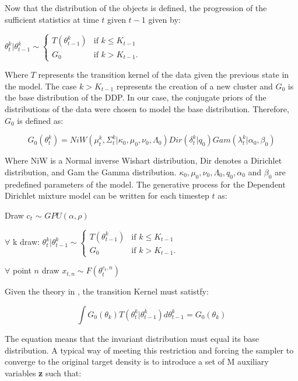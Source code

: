 \documentclass[]{article}
\begin{document}
Now that the distribution of the objects is defined, the progression of the sufficient statistics at time $t$ given $t-1$ given by:

$\theta_t^k | \theta_{t-1}^k \sim
\begin{cases} T (\theta_{t-1}^k) &\mbox{if } k \leq K_{t-1} \\
G_0 & \mbox{if } k > K_{t-1}. \end{cases}$

Where $T$ represents the transition kernel of the data given the previous state in the model. The case $ k > K_{t-1} $ represents the creation of a new cluster and $G_0$ is the base distribution of the DDP. In our case, the conjugate priors of the distributions of the data were chosen to model the base distribution. Therefore, $G_0$ is defined as:

$$ G_0(\theta_t^k)  = NiW( \mu_t^k, \Sigma_t^k | \kappa_0, \mu_0, \nu_0, \Lambda_0 ) Dir(\delta_t^k | q_0) Gam( \lambda_t^k | \alpha_0, \beta_0) $$

Where NiW is a Normal inverse Wishart distribution, Dir denotes a Dirichlet distribution, and Gam the Gamma distribution. $ \kappa_0, \mu_0, \nu_0, \Lambda_0, q_0,\alpha_0$ and $\beta_0$ are predefined parameters of the model. The generative process for the Dependent Dirichlet mixture model can be written for each timestep $t$ as:


\begin{compactitem}
\item Draw  $c_t$ $\sim$ $GPU(\alpha, \rho) $
\item $\forall$  k draw: $ \theta_t^k | \theta_{t-1}^k \sim
    \begin{cases} T (\theta_{t-1}^k) &\mbox{if } k \leq K_{t-1} \\
G_0 & \mbox{if } k > K_{t-1}. \end{cases}$
\item $\forall$  point $n$ draw $ x_{t,n} \sim F(\theta_t^{c_t,n})$
\end{compactitem}

Given the theory in \cite{caron}, the transition Kernel must satistfy:

$$ \int G_0(\theta_k) T(\theta_t^k | \theta_{t-1}^k) d\theta_{t-1}^k =  G_0(\theta_k) $$

The equation means that the invariant distribution must equal its base distribution. A typical way of meeting this restriction and forcing the sampler to converge to the original target density\cite{smc:theory} is to introduce a set of M auxiliary variables \textbf{z} such that:
\end{document}
